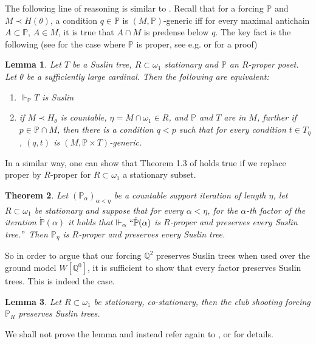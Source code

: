 \documentclass[a4paper,11pt]{article}
\newtheorem{theorem}{Theorem}[section]
\newtheorem{lemma}[theorem]{Lemma}
\newcommand{\forceP}{\mathbb{P}}
\newcommand{\forceQ}{\mathbb{Q}}
\begin{document}
The following  line of reasoning is similar to \cite{Ho}.
Recall that for a forcing $\forceP$ and $M \prec H(\theta)$, a condition $q \in \forceP$ is $(M,\forceP)$-generic iff for every maximal antichain $A \subset \forceP$, $A \in M$, it is true that $ A \cap M$ is predense below $q$.
The key fact is the following (see \cite{Miyamoto2} for the case where $\forceP$ is proper, see e.g. \cite{Ho2} or \cite{Ho3} for a proof)
\begin{lemma}\label{preservation of Suslin trees}
 Let $T$ be a Suslin tree, $R \subset \omega_1$ stationary and $\forceP$ an $R$-proper
 poset. Let $\theta$ be a sufficiently large cardinal.
 Then the following are equivalent:
 \begin{enumerate}
  \item $\Vdash_{\forceP} T$ is Suslin
 
  \item if $M \prec H_{\theta}$ is countable, $\eta = M \cap \omega_1 \in R$, and $\forceP$ and $T$ are in $M$,
  further if $p \in \forceP \cap M$, then there is a condition $q<p$ such that 
  for every condition $t \in T_{\eta}$, 
  $(q,t)$ is $(M, \forceP \times T)$-generic.
 \end{enumerate}

\end{lemma}


In a similar way, one can show that Theorem 1.3 of \cite{Miyamoto2} holds true if we replace proper by $R$-proper for $R \subset \omega_1$ a stationary subset.
\begin{theorem}
Let $(\forceP_{\alpha})_{\alpha < \eta}$ be a countable support iteration of length $\eta$, let $R \subset \omega_1$ be stationary and suppose that for every $\alpha < \eta$, for the $\alpha$-th factor of the iteration $\dot{\forceP}(\alpha)$ it holds that $\Vdash_{\alpha}  ``\dot{\forceP}(\alpha)$ is $R$-proper and 
preserves every Suslin tree.$"$ Then $\forceP_{\eta}$ is $R$-proper and preserves every Suslin tree.
\end{theorem}
So in order to argue that our forcing $\forceQ^2$ preserves Suslin trees when used over the ground model $W[\forceQ^0]$, it is sufficient to show that every factor preserves Suslin trees.
This is indeed the case.
\begin{lemma}
Let $R \subset \omega_1$ be stationary, co-stationary, then the club shooting forcing $\forceP_R$ preserves Suslin trees.
\end{lemma}
We shall not prove the lemma and instead refer again to \cite{Ho1}, \cite{Ho2} or \cite{Ho3} for details.
\end{document}
